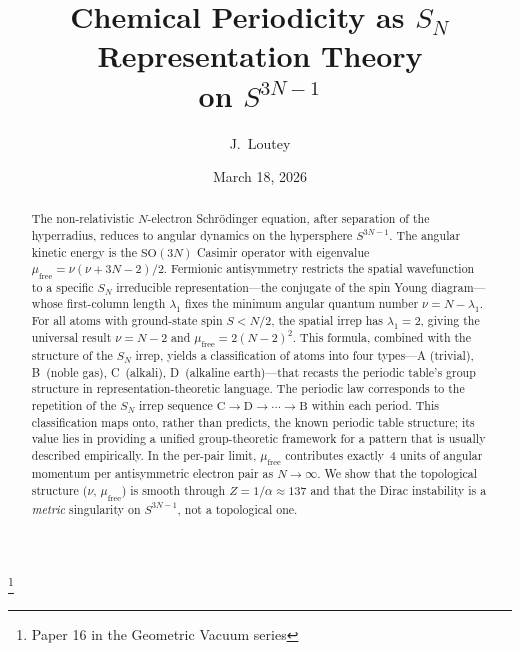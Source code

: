 \documentclass[aps,prl,twocolumn,superscriptaddress,longbibliography]{revtex4-2}
\newcommand{\mufree}{\mu_{\mathrm{free}}}
\begin{document}
\title{Chemical Periodicity as $S_N$ Representation Theory\\
on $S^{3N-1}$}
\thanks{Paper 16 in the Geometric Vacuum series}

\author{J.~Loutey}

\date{March 18, 2026}


\begin{abstract}
The non-relativistic $N$-electron Schr\"odinger equation, after
separation of the hyperradius, reduces to angular dynamics on the
hypersphere $S^{3N-1}$.  The angular kinetic energy is the
$\mathrm{SO}(3N)$ Casimir operator with eigenvalue
$\mufree = \nu(\nu + 3N - 2)/2$.  Fermionic antisymmetry restricts
the spatial wavefunction to a specific $S_N$ irreducible
representation---the conjugate of the spin Young diagram---whose
first-column length $\lambda_1$ fixes the minimum angular quantum
number $\nu = N - \lambda_1$.  For all atoms with ground-state spin
$S < N/2$, the spatial irrep has $\lambda_1 = 2$, giving the
universal result $\nu = N - 2$ and $\mufree = 2(N-2)^2$.  This
formula, combined with the structure of the $S_N$ irrep, yields a
classification of atoms into four types---A (trivial), B~(noble gas),
C~(alkali), D~(alkaline earth)---that recasts the periodic table's
group structure in representation-theoretic language.  The periodic law
corresponds to the repetition of the $S_N$ irrep sequence
$\mathrm{C} \to \mathrm{D} \to \cdots \to \mathrm{B}$ within each
period.  This classification maps onto, rather than predicts, the
known periodic table structure; its value lies in providing a
unified group-theoretic framework for a pattern that is usually
described empirically.  In the per-pair limit, $\mufree$
contributes exactly~4 units of angular momentum per antisymmetric
electron pair as $N \to \infty$.  We show that the topological
structure ($\nu$, $\mufree$) is smooth through $Z = 1/\alpha \approx
137$ and that the Dirac instability is a \emph{metric} singularity on
$S^{3N-1}$, not a topological one.
\end{abstract}

\maketitle

\end{document}
